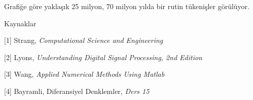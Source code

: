 \documentclass[12pt,fleqn]{article}\usepackage{../../common}
\begin{document}
Grafiğe göre yaklaşık 25 milyon, 70 milyon yılda bir rutin tükenişler görülüyor.


Kaynaklar

[1] Strang, {\em Computational Science and Engineering}

[2] Lyons, {\em Understanding Digital Signal Processing, 2nd Edition}

[3] Wang, {\em Applied Numerical Methods Using Matlab}

[4] Bayramli, Diferansiyel Denklemler, {\em Ders 15}
\end{document}

